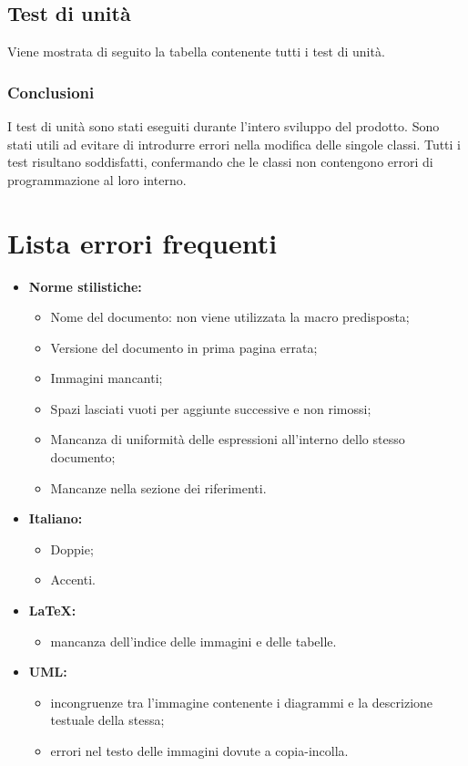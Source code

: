 \documentclass[a4paper]{article}
\begin{document}
	\subsection{Test di unità}
		Viene mostrata di seguito la tabella contenente tutti i test di unità. 
		
	\subsubsection{Conclusioni}
	I test di unità sono stati eseguiti durante l'intero sviluppo del prodotto. Sono stati utili ad evitare di introdurre errori nella modifica delle singole classi. Tutti i test risultano soddisfatti, confermando che le classi non contengono errori di programmazione al loro interno.
		
			
			\section{Lista errori frequenti}
			\begin{itemize}
					\item \textbf{Norme stilistiche:}
					\begin{itemize}
						\item Nome del documento: non viene utilizzata la macro predisposta;
						\item Versione del documento in prima pagina errata;
						\item Immagini mancanti;
						\item Spazi lasciati vuoti per aggiunte successive e non rimossi;
						\item Mancanza di uniformità delle espressioni all'interno dello stesso documento;
						\item Mancanze nella sezione dei riferimenti.
					\end{itemize}
					\item \textbf{Italiano:}
					\begin{itemize}
						\item Doppie;
						\item Accenti.
					\end{itemize}
					\item \textbf{\LaTeX :}
					\begin{itemize}
						\item mancanza dell'indice delle immagini e delle tabelle.
					\end{itemize}
					\item \textbf{UML:}
					\begin{itemize}
						\item incongruenze tra l'immagine contenente i diagrammi e la descrizione testuale della stessa;
						\item errori nel testo delle immagini dovute a copia-incolla.
					\end{itemize}
				\end{itemize}
				
\cleardoublepage
	\listoffigures
	
	\cleardoublepage
	\listoftables	
\end{document}
